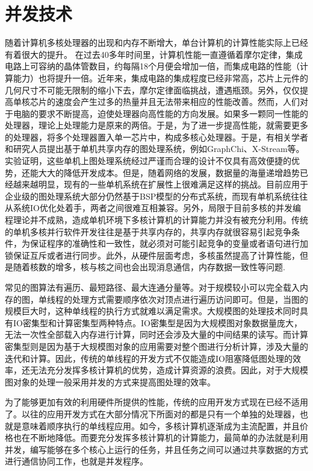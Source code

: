 \section{并发技术}

随着计算机多核处理器的出现和内存不断增大，单台计算机的计算性能实际上已经有着很大的提升。
在过去40多年时间里，计算机性能一直遵循着摩尔定律，集成电路上可容纳的晶体管数目，约每隔18个月便会增加一倍，而集成电路的性能（计算能力）也将提升一倍。近年来，集成电路的集成程度已经非常高，芯片上元件的几何尺寸不可能无限制的缩小下去，摩尔定律面临挑战，遭遇瓶颈。另外，仅仅提高单核芯片的速度会产生过多的热量并且无法带来相应的性能改善。然而，人们对于电脑的要求不断提高，迫使处理器向高性能的方向发展。如果多一颗同一性能的处理器，理论上处理能力是原来的两倍。于是，为了进一步提高性能，就需要更多的处理器，将多个处理器置入单一芯片中，构成多核心处理器。于是，有相关学者和研究人员提出基于单机共享内存的图处理系统，例如GraphChi、X-Stream等。实验证明，这些单机上图处理系统经过严谨而合理的设计不仅具有高效便捷的优势，还能大大的降低开发成本。但是，随着网络的发展，数据量的海量递增趋势已经越来越明显，现有的一些单机系统在扩展性上很难满足这样的挑战。目前应用于企业级的图处理系统大部分仍然基于BSP模型的分布式系统，而现有单机系统往往从系统IO优化处着手，两者之间很难互相兼容。另外，局限于目前多核的并发编程理论并不成熟，造成单机环境下多核计算机的计算能力并没有被充分利用。传统的单机多核并行软件开发往往是基于共享内存的，共享内存就很容易引起竞争条件，为保证程序的准确性和一致性，就必须对可能引起竞争的变量或者语句进行加锁保证互斥或者进行同步。此外，从硬件层面考虑，多核虽然提高了计算性能，但是随着核数的增多，核与核之间也会出现消息通信，内存数据一致性等问题.

常见的图算法有遍历、最短路径、最大连通分量等。对于规模较小可以完全载入内存的图，单线程的处理方式需要顺序依次对顶点进行遍历访问即可。但是，当图的规模巨大时，这种单线程的执行方式就难以满足需求。大规模图的处理技术同时具有IO密集型和计算密集型两种特点。IO密集型是因为大规模图对象数据量庞大，无法一次性全部载入内存进行计算，同时还会涉及大量的中间结果的读写。而计算密集型则是因为基于大规模图对象的应用需要对整个图进行分析计算，涉及大量的迭代和计算。因此，传统的单线程的开发方式不仅能造成IO阻塞降低图处理的效率，还无法充分发挥多核计算机的优势，造成计算资源的浪费。因此，对于大规模图对象的处理一般采用并发的方式来提高图处理的效率。

为了能够更加有效的利用硬件所提供的性能，传统的应用开发方式现在已经不适用了。以往的应用开发方式在大部分情况下所面对的都是只有一个单独的处理器，也就是意味着顺序执行的单线程应用。如今，多核计算机逐渐成为主流配置，并且价格也在不断地降低。而要充分发挥多核计算机的计算能力，最简单的办法就是利用并发，编写能够在多个核心上运行的任务，并且任务之间可以通过共享数据的方式进行通信协同工作，也就是并发程序。


